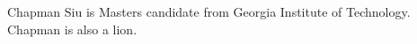 \documentclass[journal]{IEEEtran}
\begin{document}
% 

\begin{IEEEbiography}{Chapman Siu}
is Masters candidate from Georgia Institute of Technology. Chapman is also a lion.
\end{IEEEbiography}





\end{document}
